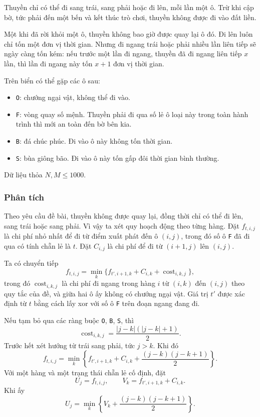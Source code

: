 \documentclass[11pt]{article}
\begin{document}
Thuyền chỉ có thể đi sang trái, sang phải hoặc đi lên, mỗi lần một ô. Trừ khi
cập bờ, tức phải đến một bến và kết thúc trò chơi, thuyền không được đi vào
đất liền.

Một khi đã rời khỏi một ô, thuyền không bao giờ được quay lại ô đó. Đi lên
luôn chỉ tốn một đơn vị thời gian. Nhưng đi ngang trái hoặc phải nhiều lần
liên tiếp sẽ ngày càng tốn kém: nếu trước một lần đi ngang, thuyền đã đi ngang
liên tiếp $x$ lần, thì lần đi ngang này tốn $x+1$ đơn vị thời gian.

Trên biển có thể gặp các ô sau:
\begin{itemize}
  \item \texttt{O}: chướng ngại vật, không thể đi vào.
  \item \texttt{F}: vòng quay số mệnh. Thuyền phải đi qua số lẻ ô loại này
  trong toàn hành trình thì mới an toàn đến bờ bên kia.
  \item \texttt{B}: đá chúc phúc. Đi vào ô này không tốn thời gian.
  \item \texttt{S}: bùa giông bão. Đi vào ô này tốn gấp đôi thời gian bình
  thường.
\end{itemize}
Dữ liệu thỏa $N,M\le 1000$.

\subsubsection*{Phân tích}

Theo yêu cầu đề bài, thuyền không được quay lại, đồng thời chỉ có thể đi lên,
sang trái hoặc sang phải. Vì vậy ta xét quy hoạch động theo từng hàng. Đặt
$f_{t,i,j}$ là chi phí nhỏ nhất để đi từ điểm xuất phát đến ô $(i,j)$, trong
đó số ô \texttt{F} đã đi qua có tính chẵn lẻ là $t$. Đặt $C_{i,j}$ là chi phí
để đi từ $(i+1,j)$ lên $(i,j)$.

Ta có chuyển tiếp
\[
  f_{t,i,j}
  =\min_k\{f_{t',i+1,k}+C_{i,k}+\operatorname{cost}_{i,k,j}\},
\]
trong đó $\operatorname{cost}_{i,k,j}$ là chi phí đi ngang trong hàng $i$ từ
$(i,k)$ đến $(i,j)$ theo quy tắc của đề, và giữa hai ô ấy không có chướng ngại
vật. Giá trị $t'$ được xác định từ $t$ bằng cách lấy xor với số ô
\texttt{F} trên đoạn ngang đang đi.

Nếu tạm bỏ qua các ràng buộc \texttt{O}, \texttt{B}, \texttt{S}, thì
\[
  \operatorname{cost}_{i,k,j}
  =\frac{|j-k|(|j-k|+1)}{2}.
\]
Trước hết xét hướng từ trái sang phải, tức $j>k$. Khi đó
\[
  f_{t,i,j}
  =\min_k\left\{
    f_{t',i+1,k}+C_{i,k}
    +\frac{(j-k)(j-k+1)}{2}
  \right\}.
\]
Với một hàng và một trạng thái chẵn lẻ cố định, đặt
\[
  U_j=f_{t,i,j},\qquad
  V_k=f_{t',i+1,k}+C_{i,k}.
\]
Khi ấy
\[
  U_j=\min_k\left\{V_k+\frac{(j-k)(j-k+1)}{2}\right\}.
\]
\end{document}
